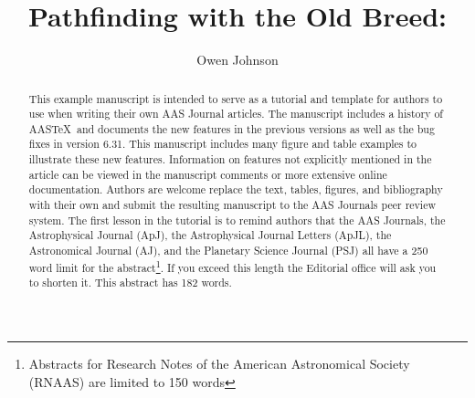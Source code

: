 \documentclass[twocolumn]{aastex631}
\newcommand\aastex{AAS\TeX}
\begin{document}
\title{Pathfinding with the Old Breed:}
\author[0000-0002-5927-0481]{Owen Johnson}



\begin{abstract}

This example manuscript is intended to serve as a tutorial and template for
authors to use when writing their own AAS Journal articles. The manuscript
includes a history of \aastex\ and documents the new features in the
previous versions as well as the bug fixes in version 6.31. This
manuscript includes many figure and table examples to illustrate these new
features.  Information on features not explicitly mentioned in the article
can be viewed in the manuscript comments or more extensive online
documentation. Authors are welcome replace the text, tables, figures, and
bibliography with their own and submit the resulting manuscript to the AAS
Journals peer review system.  The first lesson in the tutorial is to remind
authors that the AAS Journals, the Astrophysical Journal (ApJ), the
Astrophysical Journal Letters (ApJL), the Astronomical Journal (AJ), and
the Planetary Science Journal (PSJ) all have a 250 word limit for the 
abstract\footnote{Abstracts for Research Notes of the American Astronomical 
Society (RNAAS) are limited to 150 words}.  If you exceed this length the
Editorial office will ask you to shorten it. This abstract has 182 words.

\end{abstract}





{}





\end{document}
